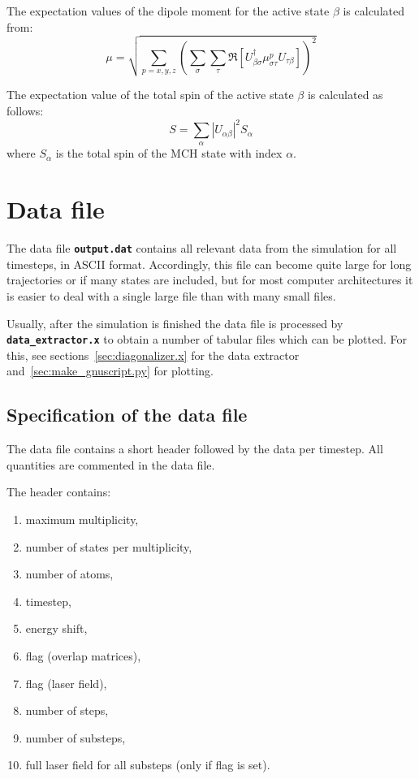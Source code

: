 \documentclass[a4paper,11pt,DIV=15,openany,twoside=false]{scrbook}
\newcommand{\ttt}[1]{\textbf{\texttt{#1}}}
\begin{document}
The expectation values of the dipole moment for the active state $\beta$ is calculated from:
\begin{equation}
  \mu=\sqrt{\sum\limits_{p=x,y,z} 
  \left(
    \sum\limits_\sigma\sum\limits_\tau
    \Re\left[
      U_{\beta\sigma}^\dagger \mu_{\sigma\tau}^p U_{\tau\beta}
    \right]
  \right)^2}
\end{equation}

The expectation value of the total spin of the active state $\beta$ is calculated as follows:
\begin{equation}
  S=\sum_\alpha |U_{\alpha\beta}|^2 S_\alpha
\end{equation}
where $S_\alpha$ is the total spin of the MCH state with index $\alpha$.

\section{Data file}\label{sec:datfile}

The data file \ttt{output.dat} contains all relevant data from the simulation for all timesteps, in ASCII format. Accordingly, this file can become quite large for long trajectories or if many states are included, but for most computer architectures it is easier to deal with a single large file than with many small files.

Usually, after the simulation is finished the data file is processed by \ttt{data\_extractor.x} to obtain a number of tabular files which can be plotted. For this, see sections~\ref{sec:diagonalizer.x} for the data extractor and~\ref{sec:make_gnuscript.py} for plotting.

\subsection{Specification of the data file}

The data file contains a short header followed by the data per timestep. All quantities are commented in the data file.

The header contains:
\begin{enumerate}
  \item maximum multiplicity,
  \item number of states per multiplicity,
  \item number of atoms,
  \item timestep,
  \item energy shift,
  \item flag (overlap matrices),
  \item flag (laser field),
  \item number of steps,
  \item number of substeps,
  \item full laser field for all substeps (only if flag is set).
\end{enumerate}
\end{document}
